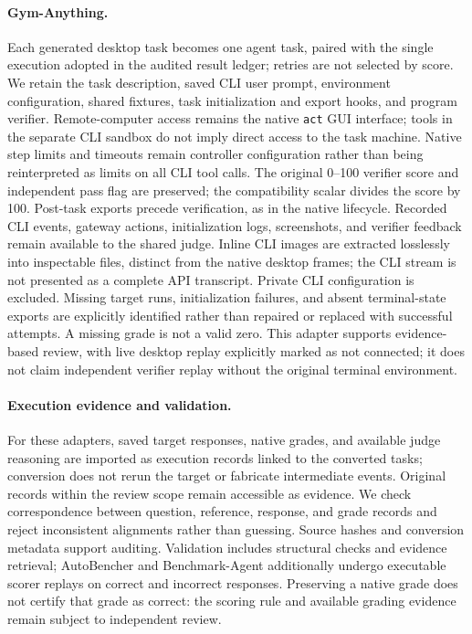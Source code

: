 \documentclass{article} %
\begin{document}
	\paragraph{Gym-Anything.}
	Each generated desktop task becomes one agent task, paired with the single
	execution adopted in the audited result ledger; retries are not selected by
	score. We retain the task description, saved CLI user prompt, environment
	configuration, shared fixtures, task initialization and export hooks, and
	program verifier. Remote-computer access remains the native \texttt{act}
	GUI interface; tools in the separate CLI sandbox do not imply direct access
	to the task machine. Native step limits and timeouts remain controller
	configuration rather than being reinterpreted as limits on all CLI tool calls.
	The original 0--100 verifier score and independent pass flag are preserved;
	the compatibility scalar divides the score by 100. Post-task exports precede
	verification, as in the native lifecycle.
	Recorded CLI events, gateway actions, initialization logs, screenshots, and
	verifier feedback remain available to the shared judge. Inline CLI images
	are extracted losslessly into inspectable files, distinct from the native
	desktop frames; the CLI stream is not presented as a complete API transcript.
	Private CLI configuration is excluded. Missing target runs, initialization
	failures, and absent terminal-state exports are explicitly identified rather
	than repaired or replaced with successful attempts. A missing grade is not
	a valid zero. This adapter supports evidence-based review, with live desktop
	replay explicitly marked as not connected; it does not claim independent
	verifier replay without the original terminal environment.

	\paragraph{Execution evidence and validation.}
	For these adapters, saved target responses, native grades, and available judge
	reasoning are imported as execution records linked to the converted tasks;
	conversion does not rerun the target or fabricate intermediate events.
	Original records within the review scope remain accessible as evidence. We check correspondence
	between question, reference, response, and grade records and reject
	inconsistent alignments rather than guessing. Source hashes and conversion
	metadata support auditing. Validation includes structural checks and evidence
	retrieval; AutoBencher and Benchmark-Agent additionally undergo executable
	scorer replays on correct and incorrect responses.
	Preserving a native grade does not certify that grade as correct: the scoring
	rule and available grading evidence remain subject to independent review.
\end{document}
